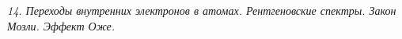 \emph{14. Переходы внутренних электронов в атомах. Рентгеновские спектры. 
Закон Мозли. Эффект Оже.}

\newpage
